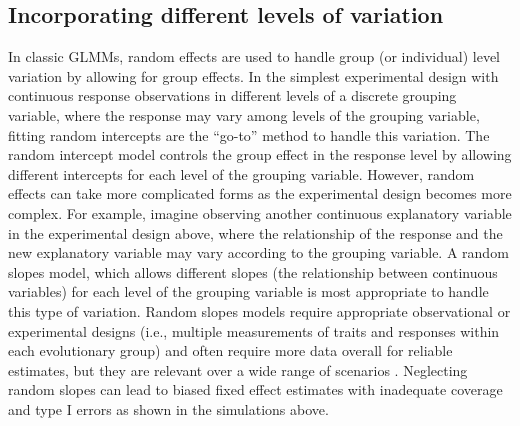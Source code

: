 \documentclass[12pt]{article}
\begin{document}
\subsection*{Incorporating different levels of variation}


In classic GLMMs, random effects are used to handle group (or individual) level variation by allowing for group effects. 
In the simplest experimental design with continuous response observations in different levels of a discrete grouping variable, where the response may vary among levels of the grouping variable, fitting random intercepts are the ``go-to'' method to handle this variation.
The random intercept model controls the group effect in the response level by allowing different intercepts for each level of the grouping variable.
However, random effects can take more complicated forms as the experimental design becomes more complex.  
For example, imagine observing another continuous explanatory variable in the experimental design above, where the relationship of the response and the new explanatory variable may vary according to the grouping variable.
A random slopes model, which allows different slopes (the relationship between continuous variables) for each level of the grouping variable is most appropriate to handle this type of variation.
Random slopes models require appropriate observational or experimental designs (i.e., multiple measurements of traits and responses within each evolutionary group) and often require more data overall for reliable estimates, but they are relevant over a wide range of scenarios \citep{schielzeth2008conclusions, cleasby2015quantifying,ord2010adaptation}.
Neglecting random slopes can lead to biased fixed effect estimates with inadequate coverage and type I errors \citep{schielzeth2008conclusions} as shown in the simulations above.
\end{document}
